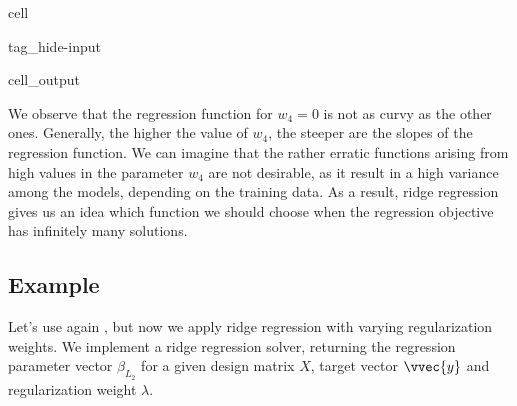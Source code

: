 \documentclass[letterpaper,10pt,english]{jupyterBook}
\begin{document}
\begin{sphinxuseclass}{cell}
\begin{sphinxuseclass}{tag_hide-input}\begin{sphinxVerbatimOutput}

\begin{sphinxuseclass}{cell_output}
\noindent{}

\end{sphinxuseclass}\end{sphinxVerbatimOutput}

\end{sphinxuseclass}
\end{sphinxuseclass}
\sphinxAtStartPar
We observe that the regression function for \(w_4=0\) is not as curvy as the other ones. Generally, the higher the value of \(w_4\), the steeper are the slopes of the regression function. We can imagine that the rather erratic functions arising from high values in the parameter \(w_4\) are not desirable, as it result in a high variance among the models, depending on the training data. As a result, ridge regression gives us an idea which function we should choose when the regression objective has infinitely many solutions.


\subsection{Example}
\label{\detokenize{regression_ridge:example}}
\sphinxAtStartPar
Let’s use again {\hyperref[\detokenize{regression_optimization:example_reg_p_larger_n}]{}}, but now we apply ridge regression with varying regularization weights. We implement a ridge regression solver, returning the regression parameter vector \(\beta_{L_2}\) for a given design matrix \(X\), target vector \(\vvec{y}\) and regularization weight \(\lambda\).
\end{document}
